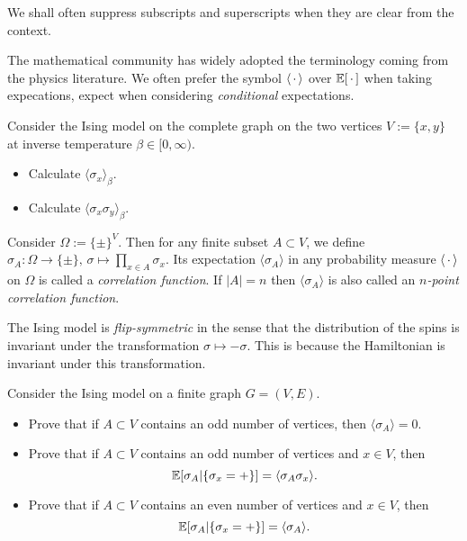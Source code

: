 \begin{remark*}
    We shall often suppress subscripts and superscripts when they are clear from the context.
\end{remark*}

\begin{remark*}
    The mathematical community has widely adopted the terminology coming from the physics
    literature.
    We often prefer the symbol $\langle\,\cdot\,\rangle$ over $\mathbb E[\,\cdot\,]$ when taking expecations,
    expect when considering \emph{conditional} expectations.
\end{remark*}

\begin{exercise}
    Consider the Ising model on the complete graph on the two vertices $V:=\{x,y\}$
    at inverse temperature $\beta\in[0,\infty)$.
    \begin{itemize}
        \item Calculate $\langle\sigma_x\rangle_\beta$.
        \item Calculate $\langle\sigma_x\sigma_y\rangle_\beta$.
    \end{itemize}
\end{exercise}

\begin{definition}
    Consider $\Omega:=\{\pm\}^V$.
    Then for any finite subset $A\subset V$,
    we define $\sigma_A:\Omega\to\{\pm\},\,\sigma\mapsto\prod_{x\in A}\sigma_x$.
    Its expectation $\langle\sigma_A\rangle$ in any probability measure $\langle\,\cdot\,\rangle$
    on $\Omega$ is called a \emph{correlation function}.
    If $|A|=n$ then $\langle\sigma_A\rangle$ is also called an \emph{$n$-point correlation function}.
\end{definition}

\begin{remark*}
    The Ising model is \emph{flip-symmetric} in the sense that the distribution of the spins is invariant under the transformation $\sigma\mapsto-\sigma$.
    This is because the Hamiltonian is invariant under this transformation.
\end{remark*}

\begin{exercise}
    Consider the Ising model on a finite graph $G=(V,E)$.
    \begin{itemize}
        \item Prove that if $A\subset V$ contains an odd number of vertices,
        then $\langle\sigma_A\rangle=0$.
        \item Prove that if $A\subset V$ contains an odd number of vertices
        and $x\in V$,
        then \[\mathbb E[\sigma_A|\{\sigma_x=+\}]=\langle \sigma_{A}\sigma_x\rangle.\]
        \item Prove that if $A\subset V$ contains an even number of vertices
        and $x\in V$,
        then \[\mathbb E[\sigma_A|\{\sigma_x=+\}]=\langle \sigma_{A}\rangle.\]
    \end{itemize}
\end{exercise}

